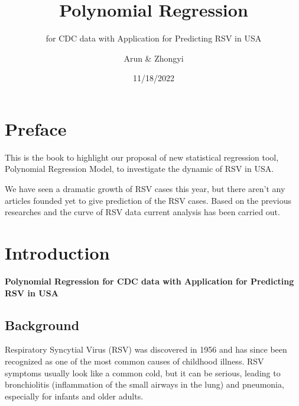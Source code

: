 \documentclass[
  letterpaper,
  DIV=11,
  numbers=noendperiod]{scrreport}
\title{Polynomial Regression}
\subtitle{for CDC data with Application for Predicting RSV in USA}
\author{Arun \& Zhongyi}
\date{11/18/2022}
\renewcommand*\contentsname{Table of contents}
\newcommand\contentsname{Table of contents}
\begin{document}
\maketitle
\ifdefined\Shaded\renewenvironment{Shaded}{\begin{tcolorbox}[borderline west={3pt}{0pt}{shadecolor}, sharp corners, interior hidden, breakable, enhanced, boxrule=0pt, frame hidden]}{\end{tcolorbox}}\fi

\renewcommand*\contentsname{Table of contents}
{
\hypersetup{linkcolor=}
\setcounter{tocdepth}{2}
\tableofcontents
}

\hypertarget{preface}{%
\chapter*{Preface}\label{preface}}

This is the book to highlight our proposal of new statistical regression
tool, Polynomial Regression Model, to investigate the dynamic of RSV in
USA.

We have seen a dramatic growth of RSV cases this year, but there aren't
any articles founded yet to give prediction of the RSV cases. Based on
the previous researches and the curve of RSV data current analysis has
been carried out.


\hypertarget{introduction}{%
\chapter{Introduction}\label{introduction}}

\textbf{Polynomial Regression for CDC data with Application for
Predicting RSV in USA}

\hypertarget{background}{%
\section{Background}\label{background}}

Respiratory Syncytial Virus (RSV) was discovered in 1956 and has since
been recognized as one of the most common causes of childhood illness.
RSV symptoms usually look like a common cold, but it can be serious,
leading to bronchiolitis (inflammation of the small airways in the lung)
and pneumonia, especially for infants and older adults.
\end{document}
